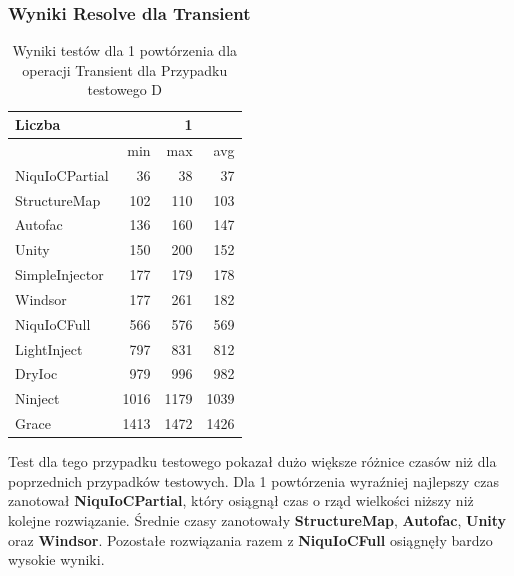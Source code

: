 \documentclass[12pt]{article}
\begin{document}
\subsubsection{Wyniki Resolve dla Transient}
\begin{table}[H]
\captionsetup{belowskip=0pt,aboveskip=0pt}
\begin{center}
\begin{small}
	\begin{tabular}{ | l | r r r | }
    		\hline
Liczba & & 1 & \\ \hline
 & min & max & avg \\ \hline
NiquIoCPartial & 36 & 38 & 37 \\ \hline
StructureMap & 102 & 110 & 103 \\ \hline
Autofac & 136 & 160 & 147 \\ \hline
Unity & 150 & 200 & 152 \\ \hline
SimpleInjector & 177 & 179 & 178 \\ \hline
Windsor & 177 & 261 & 182 \\ \hline
NiquIoCFull & 566 & 576 & 569 \\ \hline
LightInject & 797 & 831 & 812 \\ \hline
DryIoc & 979 & 996 & 982 \\ \hline
Ninject & 1016 & 1179 & 1039 \\ \hline
Grace & 1413 & 1472 & 1426 \\ \hline
  	\end{tabular}
\end{small}
\end{center}
\caption{Wyniki testów dla 1 powtórzenia dla operacji Transient dla Przypadku testowego D}
\label{TestCaseD_Transient1}
\end{table}
Test dla tego przypadku testowego pokazał dużo większe różnice czasów niż dla poprzednich przypadków testowych. Dla 1 powtórzenia wyraźniej najlepszy czas zanotował \textbf{NiquIoCPartial}, który osiągnął czas o rząd wielkości niższy niż kolejne rozwiązanie. Średnie czasy zanotowały \textbf{StructureMap}, \textbf{Autofac}, \textbf{Unity} oraz \textbf{Windsor}. Pozostałe rozwiązania razem z \textbf{NiquIoCFull} osiągnęły bardzo wysokie wyniki.
\\ \\
\end{document}
